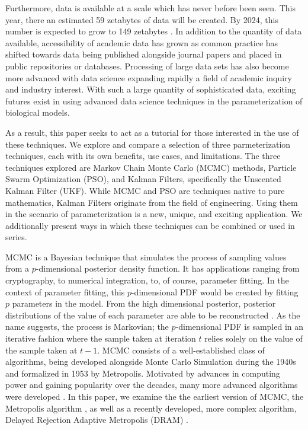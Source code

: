 \documentclass{article}
\begin{document}
\par Furthermore, data is available at a scale which has never before been seen. This year, there an estimated 59 zetabytes of data will be created. By 2024, this number is expected to grow to 149 zetabytes \cite{data_growth}. In addition to the quantity of data available, accessibility of academic data has grown as common practice has shifted towards data being published alongside journal papers and placed in public repositories or databases. Processing of large data sets has also become more advanced with data science expanding rapidly a field of academic inquiry and industry interest. With such a large quantity of sophisticated data, exciting futures exist in using advanced data science techniques in the parameterization of biological models. 
\par As a result, this paper seeks to act as a tutorial for those interested in the use of these techniques. We explore and compare a selection of three parmeterization techniques, each with its own benefits, use cases, and limitations. The three techniques explored are Markov Chain Monte Carlo (MCMC) methods, Particle Swarm Optimization (PSO), and Kalman Filters, specifically the Unscented Kalman Filter (UKF). While MCMC and PSO are techniques native to pure mathematics, Kalman Filters originate from the field of engineering. Using them in the scenario of parameterization is a new, unique, and exciting application. We additionally present ways in which these techniques can be combined or used in series.
\par MCMC is a Bayesian technique that simulates the process of sampling values from a $p$-dimensional posterior density function. It has applications ranging from cryptography, to numerical integration, to, of course, parameter fitting. In the context of parameter fitting, this $p$-dimensional PDF would be created by fitting $p$ parameters in the model. From the high dimensional posterior, posterior distributions of the value of each parameter are able to be reconstructed \cite{MCMCintro}. As the name suggests, the process is Markovian; the $p$-dimensional PDF is sampled in an iterative fashion where the sample taken at iteration $t$ relies solely on the value of the sample taken at $t-1$. MCMC consists of a well-established class of algorithms, being developed alongside Monte Carlo Simulation during the 1940s and formalized in 1953 by Metropolis. Motivated by advances in computing power and gaining popularity over the decades, many more advanced algorithms were developed \cite{MCMChistory}. In this paper, we examine the the earliest version of MCMC, the Metropolis algorithm \cite{metropolis1953}, as well as a recently developed, more complex algorithm, Delayed Rejection Adaptive Metropolis (DRAM) \cite{DRAM}.
\end{document}
